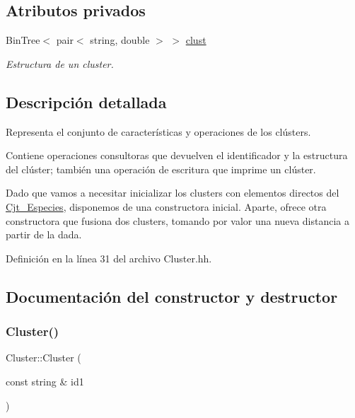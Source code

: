 \subsection*{Atributos privados}
\begin{DoxyCompactItemize}
\item 
Bin\+Tree$<$ pair$<$ string, double $>$ $>$ \hyperlink{class_cluster_aaada1982eafeb072ce83cb6a3d5445e4}{clust}
\begin{DoxyCompactList}\small\item\em Estructura de un cluster. \end{DoxyCompactList}\end{DoxyCompactItemize}


\subsection{Descripción detallada}
Representa el conjunto de características y operaciones de los clústers. 

Contiene operaciones consultoras que devuelven el identificador y la estructura del clúster; también una operación de escritura que imprime un clúster.

Dado que vamos a necesitar inicializar los clusters con elementos directos del \hyperlink{class_cjt___especies}{Cjt\+\_\+\+Especies}, disponemos de una constructora inicial. Aparte, ofrece otra constructora que fusiona dos clusters, tomando por valor una nueva distancia a partir de la dada. 

Definición en la línea 31 del archivo Cluster.\+hh.



\subsection{Documentación del constructor y destructor}
\mbox{\label{class_cluster_ac7675689117c001824a50015bfc5e53c}} 
\subsubsection{\texorpdfstring{Cluster()}{Cluster()}\hspace{0.1cm}{\footnotesize\ttfamily [1/2]}}
{\footnotesize\ttfamily Cluster\+::\+Cluster (\begin{DoxyParamCaption}\item[{const string \&}]{id1 }\end{DoxyParamCaption})}



